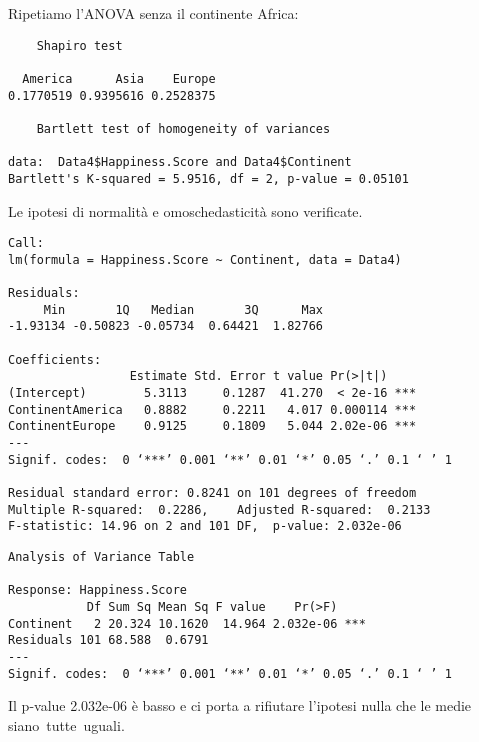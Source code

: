 \documentclass{beamer}
\newcommand{\fg}[2]{%
  \begin{center}
      \texttt{[image: \#2]}%
  \end{center}
}
\begin{document}
\begin{frame}[fragile]
    Ripetiamo l'ANOVA senza il continente Africa:
\end{frame}

\begin{frame}[fragile]
    \tiny
    \begin{verbatim}
    Shapiro test

  America      Asia    Europe 
0.1770519 0.9395616 0.2528375

    Bartlett test of homogeneity of variances

data:  Data4$Happiness.Score and Data4$Continent
Bartlett's K-squared = 5.9516, df = 2, p-value = 0.05101
    \end{verbatim}

    \normalsize Le ipotesi di normalità e omoschedasticità sono verificate.
\end{frame}

\begin{frame}[fragile]
    \tiny
    \begin{verbatim}
Call:
lm(formula = Happiness.Score ~ Continent, data = Data4)

Residuals:
     Min       1Q   Median       3Q      Max 
-1.93134 -0.50823 -0.05734  0.64421  1.82766 

Coefficients:
                 Estimate Std. Error t value Pr(>|t|)    
(Intercept)        5.3113     0.1287  41.270  < 2e-16 ***
ContinentAmerica   0.8882     0.2211   4.017 0.000114 ***
ContinentEurope    0.9125     0.1809   5.044 2.02e-06 ***
---
Signif. codes:  0 ‘***’ 0.001 ‘**’ 0.01 ‘*’ 0.05 ‘.’ 0.1 ‘ ’ 1

Residual standard error: 0.8241 on 101 degrees of freedom
Multiple R-squared:  0.2286,    Adjusted R-squared:  0.2133 
F-statistic: 14.96 on 2 and 101 DF,  p-value: 2.032e-06 
    \end{verbatim}
\end{frame}

\begin{frame}[fragile]
    \tiny
    \begin{verbatim}
Analysis of Variance Table

Response: Happiness.Score
           Df Sum Sq Mean Sq F value    Pr(>F)    
Continent   2 20.324 10.1620  14.964 2.032e-06 ***
Residuals 101 68.588  0.6791                      
---
Signif. codes:  0 ‘***’ 0.001 ‘**’ 0.01 ‘*’ 0.05 ‘.’ 0.1 ‘ ’ 1
    \end{verbatim}

    \normalsize Il p-value 2.032e-06 è basso e ci porta a rifiutare l'ipotesi nulla che le medie siano tutte uguali.
\end{frame}
\end{document}
